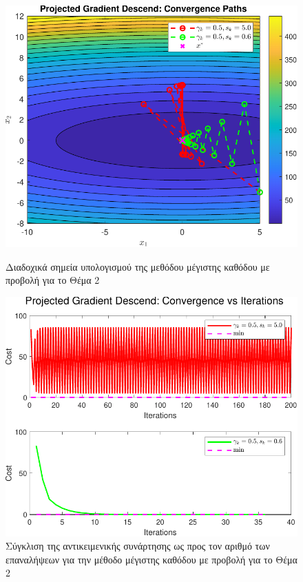 \documentclass[a4paper,12pt]{article}
\begin{document}
\begin{figure}[h]
    \centering
    \begin{minipage}{0.47\textwidth}
        \centering
        \includegraphics[width=1\linewidth]{plot/task2_contour.pdf}
        \caption{\small Διαδοχικά σημεία υπολογισμού της μεθόδου μέγιστης καθόδου με προβολή για το Θέμα 2}
        \label{fig:task2_contour}
    \end{minipage} \hfill
    \begin{minipage}{0.47\textwidth}
        \centering
        \includegraphics[width=1\linewidth]{plot/task2_convergence.pdf}
        \caption{\small Σύγκλιση της αντικειμενικής συνάρτησης ως προς τον αριθμό των επαναλήψεων για την μέθοδο μέγιστης καθόδου με προβολή για το Θέμα 2}
        \label{fig:task2_convergence}
    \end{minipage}
\end{figure}
\end{document}
